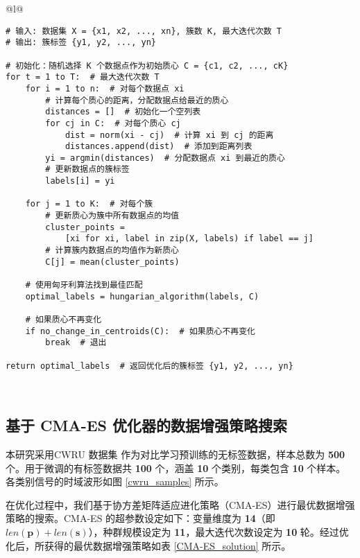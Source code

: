 \documentclass[master]{thesis-uestc}
\begin{document}
\begin{table}[h]
    \caption{KMeans算法伪代码}
    \begin{tabular}{@{}l@{}} %
    \toprule
     \\ %
    \midrule
    \begin{lstlisting}[basicstyle=\ttfamily,frame=none]
# 输入: 数据集 X = {x1, x2, ..., xn}, 簇数 K, 最大迭代次数 T
# 输出: 簇标签 {y1, y2, ..., yn}

# 初始化：随机选择 K 个数据点作为初始质心 C = {c1, c2, ..., cK}
for t = 1 to T:  # 最大迭代次数 T
    for i = 1 to n:  # 对每个数据点 xi
        # 计算每个质心的距离，分配数据点给最近的质心
        distances = []  # 初始化一个空列表
        for cj in C:  # 对每个质心 cj
            dist = norm(xi - cj)  # 计算 xi 到 cj 的距离
            distances.append(dist)  # 添加到距离列表
        yi = argmin(distances)  # 分配数据点 xi 到最近的质心
        # 更新数据点的簇标签
        labels[i] = yi
    
    for j = 1 to K:  # 对每个簇
        # 更新质心为簇中所有数据点的均值
        cluster_points = 
            [xi for xi, label in zip(X, labels) if label == j]
        # 计算簇内数据点的均值作为新质心
        C[j] = mean(cluster_points)
    
    # 使用匈牙利算法找到最佳匹配
    optimal_labels = hungarian_algorithm(labels, C)
    
    # 如果质心不再变化
    if no_change_in_centroids(C):  # 如果质心不再变化
        break  # 退出

return optimal_labels  # 返回优化后的簇标签 {y1, y2, ..., yn}
    \end{lstlisting} \\
    \bottomrule
    \end{tabular}
    \label{table:kmeans_code}
\end{table}

\subsection{基于 CMA-ES 优化器的数据增强策略搜索}
\label{sec:CMA-ES_result}

本研究采用CWRU 数据集 作为对比学习预训练的无标签数据，样本总数为 \textbf{500} 个。用于微调的有标签数据共 \textbf{100} 个，涵盖 \textbf{10} 个类别，每类包含 \textbf{10} 个样本。各类别信号的时域波形如图 \ref{cwru_samples} 所示。

在优化过程中，我们基于协方差矩阵适应进化策略（CMA-ES）进行最优数据增强策略的搜索。CMA-ES 的超参数设定如下：变量维度为 \textbf{14}（即 \(len(\mathbf{p}) + len(\mathbf{s})\)），种群规模设定为 \textbf{11}，最大迭代次数设定为 \textbf{10} 轮。经过优化后，所获得的最优数据增强策略如表 \ref{CMA-ES_solution} 所示。
\end{document}
